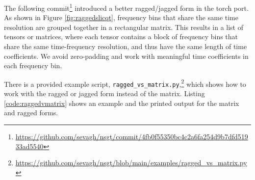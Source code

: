 \documentclass[report.tex]{subfiles}
\begin{document}
The following commit\footnote{\url{https://github.com/sevagh/nsgt/commit/4fb0f55350bc4c2a6fa254d9b7dfd51933ad5540}} introduced a better ragged/jagged form in the torch port. As shown in Figure \ref{fig:raggedslicqt}, frequency bins that share the same time resolution are grouped together in a rectangular matrix. This results in a list of tensors or matrices, where each tensor contains a block of frequency bins that share the same time-frequency resolution, and thus have the same length of time coefficients. We avoid zero-padding and work with meaningful time coefficients in each frequency bin.

There is a provided example script, \Verb#ragged_vs_matrix.py#,\footnote{\url{https://github.com/sevagh/nsgt/blob/main/examples/ragged_vs_matrix.py}} which shows how to work with the ragged or jagged form instead of the matrix. Listing \ref{code:raggedvmatrix} shows an example and the printed output for the matrix and ragged forms.
\end{document}
